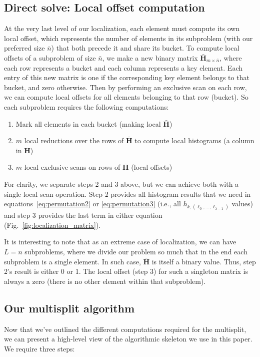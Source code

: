 \subsection{Direct solve: Local offset computation}
At the very last level of our localization,
each element must compute its own local offset, which represents the number of elements in its subproblem (with our preferred size $\bar{n}$) that both precede it and share its bucket.
To compute local offsets of a subproblem of size $\bar{n}$, we  make a new binary matrix $\bar{\mathbf{H}}_{m\times \bar{n}}$, where each row represents a bucket and each column represents a key element.
Each entry of this new matrix is one if the corresponding key element belongs to that bucket, and zero otherwise.
Then by performing an exclusive scan on each row, we can compute local offsets for all elements belonging to that row (bucket). So each subproblem requires the following computations:
\begin{enumerate}
        \item Mark all elements in each bucket (making local $\bar{\mathbf{H}}$)
        \item $m$ local reductions over the rows of $\bar{\mathbf{H}}$ to compute local histograms (a column in $\mathbf{H}$)
        \item $m$ local exclusive scans on rows of $\bar{\mathbf{H}}$ (local offsets)
\end{enumerate}
For clarity, we separate steps 2 and 3 above, but we can achieve both with a single local scan operation.
Step 2 provides all histogram results that we need in equations~\eqref{eq:permutation2} or \eqref{eq:permutation3} (i.e., all $h_{k, (\ell_0, \dots, \ell_{\lambda-1})}$ values) and step 3 provides the last term in either equation (Fig.~\ref{fig:localization_matrix}).

It is interesting to note that as an extreme case of localization, we can have $L = n$ subproblems, where we divide our problem so much that in the end each subproblem is a single element. In such case, $\bar{\mathbf{H}}$ is itself a binary value. Thus, step 2's result is either 0 or 1. The local offset (step 3) for such a singleton matrix is always a zero (there is no other element within that subproblem).

\subsection{Our multisplit algorithm}

Now that we've outlined the different computations required for the multisplit, we can present a high-level view of the algorithmic skeleton we use in this paper. We require three steps:

